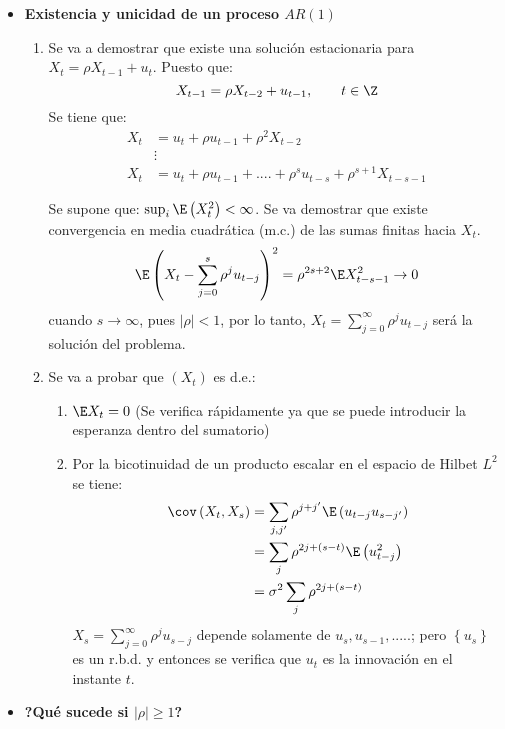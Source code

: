 \begin{itemize}
\item \textbf{Existencia y unicidad de un proceso $AR(1)$}
	\begin{enumerate}
	\item Se va a demostrar que existe una soluci\'{o}n estacionaria para $X_{t} =\rho X_{t-1} +u_{t} $. Puesto que:
	\[
		X_{t-1} =\rho X_{t-2} +u_{t-1} ,
		\qquad
		t\in \Z
	\]
	Se tiene que:
	\begin{align*}
	X_{t} &=u_{t} +\rho u_{t-1} +\rho^{2}X_{t-2} \\ 
		 &\vdots \\ 
	X_{t} &=u_{t} +\rho u_{t-1} +....+\rho^{s}u_{t-s} +\rho^{s+1}X_{t-s-1}
	\end{align*}
	
	Se supone que: $\sup_i\E\left(X_{t}^{2} \right)<\infty$. Se va demostrar que existe convergencia en media cuadr\'{a}tica (m.c.) de las sumas finitas hacia $X_{t}$. 
	\[
	 \E\left( {X_{t} -\sum_{j=0}^s {\rho^{j}u_{t-j} } } \right)^{2}=\rho^{2s+2}\E X_{t-s-1}^{2} \to 0
	\]
	cuando $s\to \infty $, pues $\left| \rho \right|<1$, por lo tanto, $X_{t} =\sum_{j=0}^\infty {\rho^{j}u_{t-j} } $ ser\'{a} la soluci\'{o}n del problema.

	\item Se va a probar que $\left( {X_{t} } \right)$ es d.e.:
	\begin{enumerate}
		\item $\E X_{t} =0$ (Se verifica r\'{a}pidamente ya que se puede introducir la esperanza dentro del sumatorio)
		\item Por la bicotinuidad de un producto escalar en el espacio de Hilbet $L^{2}$ se tiene: 
		\begin{align*}
		 \cov\left( {X_{t} ,X_{s} } \right)
			 &=\sum_{j,j'} {\rho^{j+j'}} \E\left( {u_{t-j} u_{s-j'} } \right)\\
			 &=\sum_j {\rho^{2j+\left( {s-t} \right)}\E\left( {u_{t-j}^{2} }\right)}\\ &=\sigma^{2}\sum_j {\rho^{2j+(s-t)}} 
		\end{align*}
		$\displaystyle X_{s} =\sum_{j=0}^\infty {\rho^{j}u_{s-j} } $ depende solamente de $u_{s} ,u_{s-1} ,.....$; pero $\left\{ {u_{s} } \right\}$ es un r.b.d. y entonces se verifica que $u_{t} $ es la innovaci\'{o}n en el instante $t.$
	\end{enumerate}
	\end{enumerate}

\item \textbf{?Qu\'{e} sucede si $\left| \rho \right|\ge 1$?}


\end{itemize}
